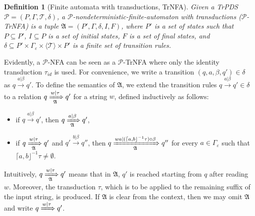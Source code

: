 \documentclass[preprint,12pt]{elsarticle}
\newtheorem{definition}{Definition}
\newcommand\Pp{{\mathcal{P} }}
\newcommand\Aut{{\mathfrak{A} }}
\newcommand\TranSet{{\mathscr{T} }}
\newcommand{\TrPDS}{\textsf{TrPDS}}
\newcommand{\TrNFA}{\textsf{TrNFA}}
\newcommand{\NFA}{\textsf{NFA}}
\begin{document}

\begin{definition}[Finite automata with transductions, {\TrNFA}] %
	Given a {\TrPDS} $\Pp=(P, \Gamma, \TranSet, \delta)$, a $\Pp$-nondeterministic-finite-automaton with transductions ($\Pp$-{\TrNFA}) is a tuple $\Aut =(P', \Gamma, \delta, I, 
	F)$,
	where $P'$ is a set of states such that $P \subseteq P'$, $I \subseteq P$ is a set of initial states, $F$ is a set of final states,  
	and $\delta \subseteq P' \times \Gamma_\varepsilon \times \langle \TranSet\rangle \times P'$ is a finite set of transition rules.
\end{definition}
Evidently, a $\Pp$-{\NFA} can be seen as a  $\Pp$-{\TrNFA} where only the identity transduction $\tau_{id}$ is used. 
%
For convenience, we write a transition $(q, a, \beta, q') \in \delta$ as $q \xrightarrow{a | \beta} q'$. 
To define the semantics of $\Aut$, we extend the transition rules $q \xrightarrow{a | \beta} q' \in \delta$  to a relation $q \xRightarrow[\Aut]{w | \tau} q'$ for a string $w$,  
%
defined inductively as follows:
\begin{itemize}
	\item if $q \xrightarrow{a |\beta} q'$, then $q \xRightarrow[\Aut]{a | \beta} q'$, 
	\item if $q \xRightarrow[\Aut]{w | \tau} q'$ and $q' \xrightarrow{b |\beta } q'' $, then $q \xRightarrow[\Aut]{w a | (\lceil a, b\rfloor^{-1}\tau) \circ \beta} q''$ for every $a \in \Gamma_\varepsilon$ such that $\lceil a, b\rfloor^{-1}\tau \neq \emptyset$.
\end{itemize}
Intuitively, $q \xRightarrow[\Aut]{w | \tau} q'$ means that in $\Aut$,  $q'$ is reached starting from $q$ after reading $w$. Moreover, the transduction $\tau$, which is  to be applied to the remaining suffix of the input string, is produced. If $\Aut$ is clear from the context, then we may omit $\Aut$ and write $q \xRightarrow{w | \tau} q'$.
\end{document}
